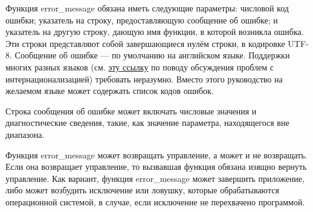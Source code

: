 \documentclass[forwardcom.tex]{subfiles}
\begin{document}
Функция  error\_message обязана иметь следующие параметры: числовой код ошибки; указатель на строку, предоставляющую сообщение об ошибке; и указатель на другую строку, дающую имя функции, в которой возникла ошибка. Эти строки представляют собой завершающиеся нулём строки, в кодировке UTF-8. Сообщение об ошибке --- по умолчанию на английском языке. Поддержки многих разных языков (см.  \href{https://en.wikibooks.org/wiki/Usability_for_Nerds/Software/Internationalization}{эту ссылку} по поводу обсуждения проблем с интернационализацией) требовать неразумно. Вместо этого руководство на желаемом языке может содержать список кодов ошибок.

Строка сообщения об ошибке может включать числовые значения и диагностические сведения, такие, как значение параметра, находящегося вне диапазона.

Функция error\_message может возвращать управление, а может и не возвращать. Если она возвращает управление, то вызвавшая функция обязана изящно вернуть управление. Как вариант, функция error\_message может завершить приложение, либо может возбудить исключение или ловушку, которые обрабатываются операционной системой, в случае, если исключение не перехвачено программой.
\end{document}
